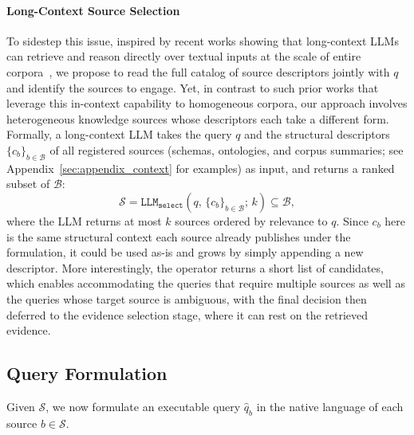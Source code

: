 \paragraph{Long-Context Source Selection}
To sidestep this issue, inspired by recent works showing that long-context LLMs can retrieve and reason directly over textual inputs at the scale of entire corpora~\citep{LOFT, ToTAL}, we propose to read the full catalog of source descriptors jointly with $q$ and identify the sources to engage. Yet, in contrast to such prior works that leverage this in-context capability to homogeneous corpora, our approach involves heterogeneous knowledge sources whose descriptors each take a different form. Formally, a long-context LLM takes the query $q$ and the structural descriptors $\{c_b\}_{b \in \mathcal{B}}$ of all registered sources (schemas, ontologies, and corpus summaries; see Appendix~\ref{sec:appendix_context} for examples) as input, and returns a ranked subset of $\mathcal{B}$:
\begin{equation}
\mathcal{S} = \texttt{LLM}_{\texttt{select}}(q,\, \{c_b\}_{b \in \mathcal{B}};\, k) \subseteq \mathcal{B},
\end{equation}
where the LLM returns at most $k$ sources ordered by relevance to $q$. Since $c_b$ here is the same structural context each source already publishes under the formulation, it could be used as-is and grows by simply appending a new descriptor. More interestingly, the operator returns a short list of candidates, which enables accommodating the queries that require multiple sources as well as the queries whose target source is ambiguous, with the final decision then deferred to the evidence selection stage, where it can rest on the retrieved evidence.

\subsection{Query Formulation}

Given $\mathcal{S}$, we now formulate an executable query $\hat{q}_b$ in the native language of each source $b \in \mathcal{S}$.

